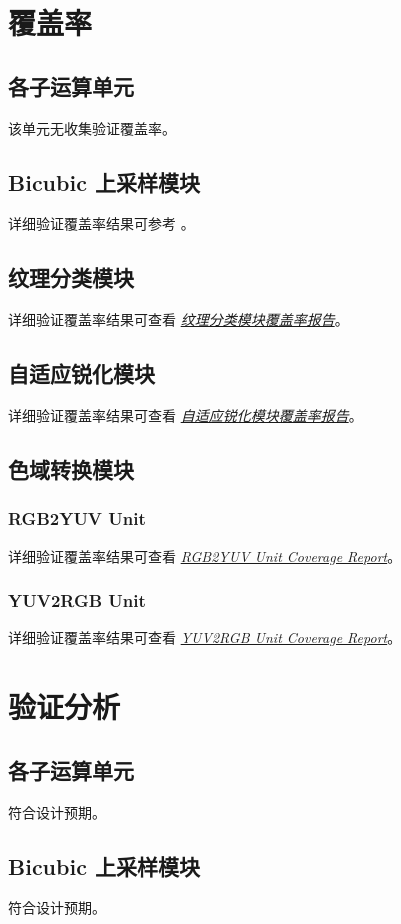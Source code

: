 \documentclass[12pt, a4paper, oneside]{ctexbook}
\begin{document}
	\section{覆盖率}
	\subsection{各子运算单元}
	该单元无收集验证覆盖率。
	\subsection{Bicubic 上采样模块}
	详细验证覆盖率结果可参考 \textbf{}。
	\subsection{纹理分类模块}
	详细验证覆盖率结果可查看 \href{file:./coverage_report/textureclassifier/dashboard.html}{\textit{纹理分类模块覆盖率报告}}。
	\subsection{自适应锐化模块}
	详细验证覆盖率结果可查看 \href{file:./coverage_report/adaptedSharpener/dashboard.html}{\textit{自适应锐化模块覆盖率报告}}。
	\subsection{色域转换模块}
	\subsubsection{RGB2YUV Unit}
	详细验证覆盖率结果可查看 \href{file:./coverage_report/rgb2yuv/dashboard.html}{\textit{RGB2YUV Unit Coverage Report}}。
	\subsubsection{YUV2RGB Unit}
	详细验证覆盖率结果可查看 \href{file:./coverage_report/yuv2rgb/dashboard.html}{\textit{YUV2RGB Unit Coverage Report}}。
	
	\section{验证分析}
	\subsection{各子运算单元}
	符合设计预期。
	\subsection{Bicubic 上采样模块}
	符合设计预期。
\end{document}
